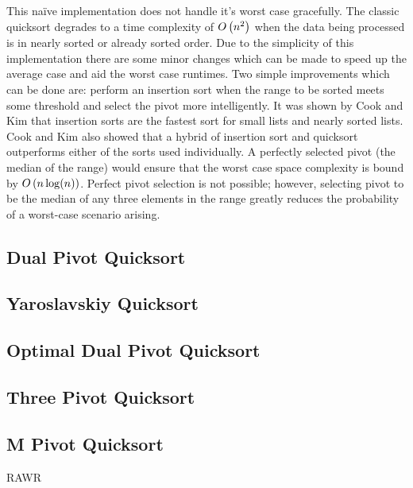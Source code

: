         This na\"{i}ve implementation does not handle it's worst case gracefully. The classic quicksort degrades to a time complexity of $O\left(n^2\right)$ when the data being processed is in nearly sorted or already sorted order. Due to the simplicity of this implementation there are some minor changes which can be made to speed up the average case and aid the worst case runtimes. Two simple improvements which can be done are: perform an insertion sort when the range to be sorted meets some threshold and select the pivot more intelligently. It was shown by Cook and Kim \cite{cook1980best} that insertion sorts are the fastest sort for small lists and nearly sorted lists. Cook and Kim also showed that a hybrid of insertion sort and quicksort outperforms either of the sorts used individually. A perfectly selected pivot (the median of the range) would ensure that the worst case space complexity is bound by $O\left(n\log(n)\right)$. Perfect pivot selection is not possible; however, selecting pivot to be the median of any three elements in the range greatly reduces the probability of a worst-case scenario arising.


	\subsection{Dual Pivot Quicksort}
		\label{subsec:DualPivotQSortIntro}
	
	\subsection{Yaroslavskiy Quicksort}    
        \label{subsec:YaroslavskiyQSortIntro}

    \subsection{Optimal Dual Pivot Quicksort}	
		\label{subsec:OptimalDualPivotQSortIntro}
	
	\subsection{Three Pivot Quicksort}	
		\label{subsec:ThreePivotQSortIntro}	
	
	\subsection{M Pivot Quicksort}	
		\label{subsec:MPivotQSortIntro}
	
		RAWR
